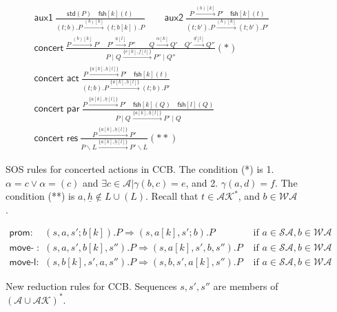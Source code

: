 \documentclass[runningheads]{llncs}
\newcommand{\Rule}[2]{\displaystyle{\frac{#1}{#2}}}
\newcommand{\paral}{\; \vert \;}
\newcommand{\mAK}{\mathcal{AK}}
\newcommand{\std}[1]{\mathsf{std}(#1)}
\newcommand{\fresh}[2]{\mathsf{fsh}[#1](#2)}
\newcommand{\rulename}[1]{\textsf{#1}}
\begin{document}
\begin{figure}
\vspace{-1ex}\[
\begin{array}{l}
\rulename{aux1}\ 
\Rule{\std{P} \quad \fresh{k}{t}}
{(t;b).P \xrightarrow{(b)[k]}(t;b[k]).P}
\qquad
\rulename{aux2}\
\Rule
{P \xrightarrow{(b)[k]} P' \quad \fresh{k}{t}}
{(t;b').P \xrightarrow{(b)[k]} (t;b').P'}
\\[15pt]
\rulename{concert}\ 
\Rule
{P\xrightarrow{(b)[k]}P' \quad P'\xrightarrow{\underline{a}[l]}P'' \qquad Q\xrightarrow{\alpha[k]}Q' 
  \quad Q'\xrightarrow{\underline{d}[l]}Q''
 }
{P \paral Q\xrightarrow{\{e[k],\underline{f}[l]\}} P'' \paral Q''} (*)\\[15pt]
\rulename{concert act}\
\Rule
{P \xrightarrow{\{{a}[k], \underline{h}[l]\}} P' \quad \fresh{k}{t}}
{(t;b).P \xrightarrow{\{{a}[k], \underline{h}[l]\}} (t;b).P'}\\[15pt]
\rulename{concert par}\
\Rule
{P \xrightarrow{\{{a}[k], \underline{h}[l]\}} P'\quad \fresh{k}{Q} \quad \fresh{l}{Q}}
{P \paral Q \xrightarrow{\{{a}[k], \underline{h}[l]\}} P' \paral Q}\\[15pt]
\rulename{concert res}\
\Rule
{P \xrightarrow{\{{a}[k], \underline{h}[l]\}} P'}
{P\backslash L \xrightarrow{\{{a}[k], \underline{h}[l]\}} P'\backslash L} (**)
%
\end{array}
\] 
\vspace{-3ex}\caption[SOS rules for concerted actions in CCB.]{SOS rules for concerted actions in CCB. The condition (*) is 1. $\alpha= c \lor \alpha = (c)$ 
and $\exists c\in \mathcal{A} | \gamma(b,c)=e$, and 2. $\gamma(a,d)=f$. 
The condition (**) is $a, \underline{h}  \notin L \cup (L)$. 
Recall that $t \in \mAK^*$, and $b \in \mathcal{WA}$.} \label{fig:csos}
\end{figure}

\begin{figure}
\vspace{-.5ex}\[
\begin{array}{lll}
\rulename{prom}: & (s,a,s';b[k]).P \Rightarrow (s,a[k],s';b).P & \mbox{ if } a \in \mathcal{SA}, b \in \mathcal{WA} 
\\[5pt]
\rulename{move-r}: & (s,a,s',b[k],s'').P \Rightarrow (s,a[k],s',b,s'').P & \mbox{ if } a \in \mathcal{SA}, b \in \mathcal{WA}
\\[5pt]
\rulename{move-l}: & (s,b[k],s',a,s'').P \Rightarrow (s,b,s',a[k],s'').P & \mbox{ if } a \in \mathcal{SA}, b \in \mathcal{WA}
\end{array}
\] 
\vspace{-3ex}\caption[Reduction rules for CCB.]{New reduction rules for CCB. Sequences $s, s', s''$ are members of $(\mathcal{A} \cup \mathcal{AK})^{*}$.} 
\label{fig:reduction}
\end{figure}
\end{document}
